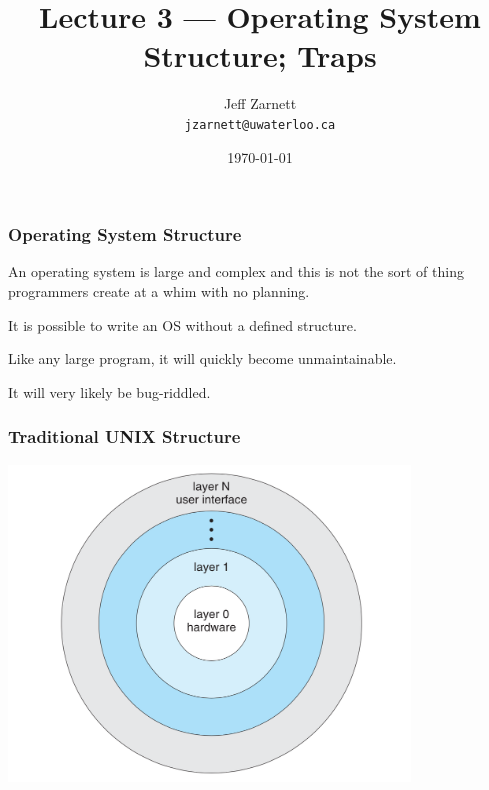 

\title{Lecture 3 --- Operating System Structure; Traps }

\author{Jeff Zarnett \\ \small \texttt{jzarnett@uwaterloo.ca}}
\date{\today}




\begin{frame}
  \titlepage

 \end{frame}

\begin{frame}
\frametitle{Operating System Structure}

An operating system is large and complex and this is not the sort of thing programmers create at a whim with no planning.

It is possible to write an OS without a defined structure. 

Like any large program, it will quickly become unmaintainable.

It will very likely be bug-riddled. 

\end{frame}

\begin{frame}
\frametitle{Traditional UNIX Structure}

\begin{center}
\includegraphics[width=0.8\textwidth]{images/layered-os.png}
\end{center}


\end{frame}

